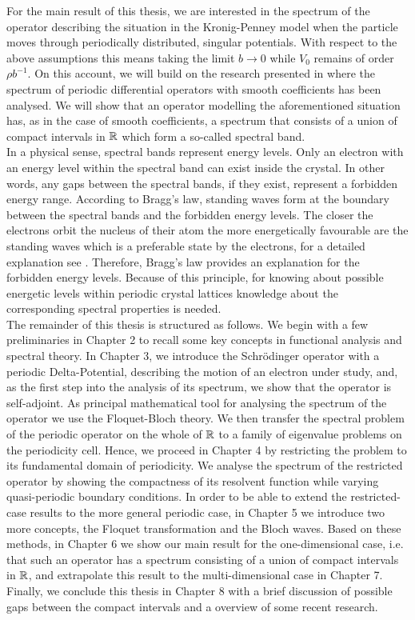 For the main result of this thesis, we are interested in the spectrum of the operator describing the situation in the Kronig-Penney model when the particle moves through periodically distributed, singular potentials. With respect to the above assumptions	 this means taking the limit $b \rightarrow 0$ while $V_{0}$ remains of order $\rho b^{-1}$. On this account, we will build on the research presented in \cite{dorfler2011photonic} where the spectrum of periodic differential operators with smooth coefficients has been analysed. We will show that an operator modelling the aforementioned situation has, as in the case of smooth coefficients, a spectrum that consists of a union of compact intervals in $\mathbb{R}$ which form a so-called spectral band. 
~\\

In a physical sense, spectral bands represent energy levels. Only an electron with an energy level within the spectral band can exist inside the crystal. In other words, any gaps between the spectral bands, if they exist, represent a forbidden energy range. According to Bragg's law, standing waves form at the boundary between the spectral bands and the forbidden energy levels. The closer the electrons orbit the nucleus of their atom the more energetically favourable are the standing waves which is a preferable state by the electrons, for a detailed explanation see \cite[Section 3.2]{heering2002elektrophysik}. Therefore, Bragg's law provides an explanation for the forbidden energy levels. Because of this principle, for knowing about possible energetic levels within periodic crystal lattices knowledge about the corresponding spectral properties is needed.
~\\

The remainder of this thesis is structured as follows. We begin with a few preliminaries in Chapter 2 to recall some key concepts in functional analysis and spectral theory. In Chapter 3, we introduce the Schrödinger operator with a periodic Delta-Potential, describing the motion of an electron under study, and, as the first step into the analysis of its spectrum, we show that the operator is self-adjoint. As principal mathematical tool for analysing the spectrum of the operator we use the Floquet-Bloch theory. We then transfer the spectral problem of the periodic operator on the whole of $\mathbb{R}$ to a family of eigenvalue problems on the periodicity cell. Hence, we proceed in Chapter 4 by restricting the problem to its fundamental domain of periodicity. We analyse the spectrum of the restricted operator by showing the compactness of its resolvent function while varying quasi-periodic boundary conditions. In order to be able to extend the restricted-case results to the more general periodic case, in Chapter 5 we introduce two more concepts, the Floquet transformation and the Bloch waves. Based on these methods, in Chapter 6 we show our main result for the one-dimensional case, i.e. that such an operator has a spectrum consisting of a union of compact intervals in $\mathbb{R}$, and extrapolate this result to the multi-dimensional case in Chapter 7. Finally, we conclude this thesis in Chapter 8 with a brief discussion of possible gaps between the compact intervals and a overview of some recent research.